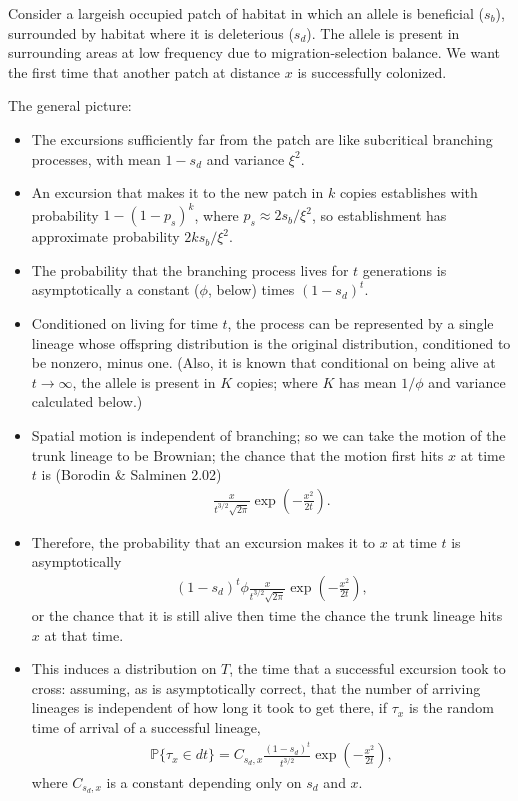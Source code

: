 \documentclass{article}
\renewcommand{\P}{\mathbb{P}}
\begin{document}
Consider a largeish occupied patch of habitat in which an allele is beneficial ($s_b$),
surrounded by habitat where it is deleterious ($s_d$).
The allele is present in surrounding areas at low frequency due to migration-selection balance.
We want the first time that another patch at distance $x$ is successfully colonized.

The general picture:
\begin{itemize}

\item The excursions sufficiently far from the patch are like subcritical branching processes,
with mean $1-s_d$ and variance $\xi^2$.

\item An excursion that makes it to the new patch in $k$ copies establishes with probability $1-(1-p_s)^k$,
where $p_s \approx 2s_b/\xi^2$, so establishment has approximate probability $2 k s_b / \xi^2$.

\item The probability that the branching process lives for $t$ generations is asymptotically a constant ($\phi$, below) times $(1-s_d)^t$.

\item Conditioned on living for time $t$, the process can be represented by a single lineage whose offspring distribution
is the original distribution, conditioned to be nonzero, minus one.
(Also, it is known that conditional on being alive at $t\to\infty$, the allele is present in $K$ copies; where $K$ has mean $1/\phi$ and variance calculated below.)

\item Spatial motion is independent of branching;
so we can take the motion of the trunk lineage to be Brownian;
the chance that the motion first hits $x$ at time $t$ is (Borodin \& Salminen 2.02)
\begin{align}
\frac{x}{t^{3/2}\sqrt{2\pi}} \exp\left(-\frac{x^2}{2t}\right) .
\end{align}

\item Therefore, the probability that an excursion makes it to $x$ at time $t$ is asymptotically
\begin{align}
  (1-s_d)^t \phi \frac{x}{t^{3/2}\sqrt{2\pi}} \exp\left(-\frac{x^2}{2t}\right) ,
\end{align}
or the chance that it is still alive then time the chance the trunk lineage hits $x$ at that time.

\item This induces a distribution on $T$, the time that a successful excursion took to cross:
assuming, as is asymptotically correct, that the number of arriving lineages is independent of how long it took to get there,
if $\tau_x$ is the random time of arrival of a successful lineage,
\begin{align} \label{eqn:arrival_time_density}
 \P\{\tau_x \in dt\} = C_{s_d,x} \frac{(1-s_d)^t}{t^{3/2}} \exp\left(-\frac{x^2}{2t}\right) ,
\end{align}
where $C_{s_d,x}$ is a constant depending only on $s_d$ and $x$.



\end{itemize}
\end{document}

